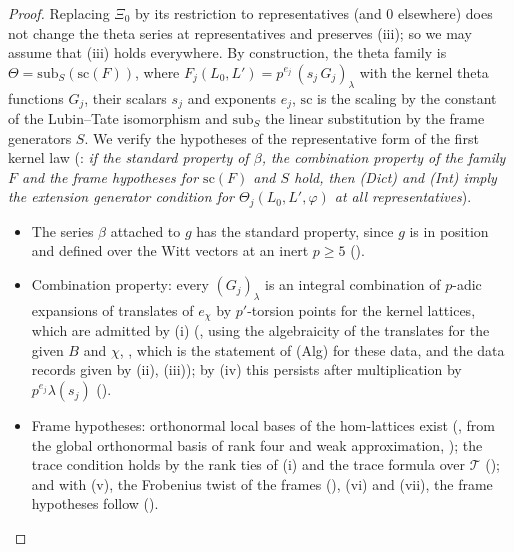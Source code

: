 \begin{proof}
Replacing $\Xi_0$ by its restriction to representatives (and $0$ elsewhere) does not change the theta series at
representatives and preserves (iii); so we may assume that (iii) holds everywhere. By construction, the theta family
is $\Theta=\mathrm{sub}_S(\mathrm{sc}(F))$, where $F_j(L_0,L')=p^{e_j}\,(s_j\,G_j)_\lambda$ with the kernel theta functions $G_j$,
their scalars $s_j$ and exponents $e_j$, $\mathrm{sc}$ is the scaling by the constant of the Lubin--Tate isomorphism and
$\mathrm{sub}_S$ the linear substitution by the frame generators $S$. We verify the hypotheses of the representative form
of the first kernel law (: \emph{if the
standard property of $\beta$, the combination property of the family $F$ and the frame hypotheses for $\mathrm{sc}(F)$
and $S$ hold, then (Dict) and (Int) imply the extension generator condition for $\Theta_j(L_0,L',\varphi)$ at all
representatives}).
\begin{itemize}
\item The series $\beta$ attached to $g$ has the standard property, since $g$ is in position and defined over the Witt
  vectors at an inert $p\ge5$ ().
\item Combination property: every $(G_j)_\lambda$ is an integral combination of $p$-adic expansions of translates of
  $e_\chi$ by $p'$-torsion points for the kernel lattices, which are admitted by (i)
  (, using the algebraicity of the translates for the given
  $B$ and $\chi$, , which is the statement of \textup{(Alg)} for these data,
  and the data records given by (ii), (iii)); by (iv) this persists after
  multiplication by $p^{e_j}\lambda(s_j)$ ().
\item Frame hypotheses: orthonormal local bases of the hom-lattices exist
  (, from the global orthonormal basis of rank four and weak
  approximation, ); the trace condition holds by the rank ties of (i)
  and the trace formula over $\mathcal T$ (); and with (v), the
  Frobenius twist of the frames (), (vi) and (vii), the frame
  hypotheses follow ().
\end{itemize}

\end{proof}
